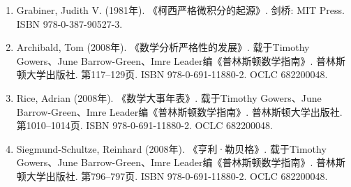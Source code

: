 \begin{enumerate}
\item Grabiner, Judith V. (1981年). 《柯西严格微积分的起源》. 剑桥: MIT Press. ISBN 978-0-387-90527-3.  

\item Archibald, Tom (2008年). 《数学分析严格性的发展》. 载于Timothy Gowers、June Barrow-Green、Imre Leader编《普林斯顿数学指南》. 普林斯顿大学出版社. 第117–129页. ISBN 978-0-691-11880-2. OCLC 682200048.  

\item Rice, Adrian (2008年). 《数学大事年表》. 载于Timothy Gowers、June Barrow-Green、Imre Leader编《普林斯顿数学指南》. 普林斯顿大学出版社. 第1010–1014页. ISBN 978-0-691-11880-2. OCLC 682200048.  

\item Siegmund-Schultze, Reinhard (2008年). 《亨利·勒贝格》. 载于Timothy Gowers、June Barrow-Green、Imre Leader编《普林斯顿数学指南》. 普林斯顿大学出版社. 第796–797页. ISBN 978-0-691-11880-2. OCLC 682200048.  

\end{enumerate}



